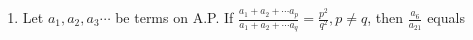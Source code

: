 \documentclass[journal,12pt,twocolumn]{IEEEtran}
\theoremstyle{remark}
\begin{document}
\begin{enumerate}[label={\arabic*.}]
\item {Let $a_1, a_2, a_3 \cdots$ be terms on A.P. If $\frac{a_1+a_2+\cdots a_p}{a_1+a_2+\cdots a_q}= \frac{p^2}{q^2},p \neq q$, then $\frac{a_6}{a_{21}}$ equals}
{\hfill{} }
\begin{enumerate}[label={\brak{\alph*}}]
\end{enumerate}




\end{enumerate}
\end{document}
